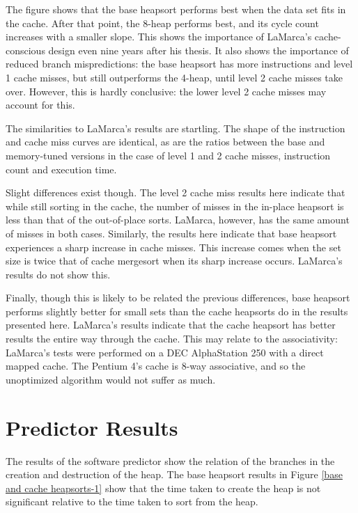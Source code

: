 The figure shows that the base heapsort performs best when the data set fits in
the cache. After that point, the 8-heap performs best, and its cycle count increases
with a smaller slope. This shows the importance of LaMarca's cache-conscious
design even nine years after his thesis. It also shows the importance of reduced
branch mispredictions: the base heapsort has more instructions and level 1 cache
misses, but still outperforms the 4-heap, until level 2 cache misses take over.
However, this is hardly conclusive: the lower level 2 cache misses may account
for this.

The similarities to LaMarca's results are startling. The shape of the
instruction and cache miss curves are identical, as are the ratios between the
base and memory-tuned versions in the case of level 1 and 2 cache misses,
instruction count and execution time.

Slight differences exist though. The level 2 cache miss results here indicate
that while still sorting in the cache, the number of misses in the in-place
heapsort is less than that of the out-of-place sorts. LaMarca, however, has the
same amount of misses in both cases. Similarly, the results here indicate that
base heapsort experiences a sharp increase in cache misses. This increase comes
when the set size is twice that of cache mergesort when its sharp increase
occurs. LaMarca's results do not show this.

Finally, though this is likely to be related the previous differences, base
heapsort performs slightly better for small sets than the cache heapsorts do in
the results presented here. LaMarca's results indicate that the cache heapsort
has better results the entire way through the cache. This may relate to the
associativity: LaMarca's tests were performed on a DEC AlphaStation 250 with a
direct mapped cache. The Pentium 4's cache is 8-way associative, and so the
unoptimized algorithm would not suffer as much.

\section{Predictor Results}


The results of the software predictor show the relation of the branches
in the creation and destruction of the heap. The base heapsort results in
Figure \ref{base and cache heapsorts-1} show that the time taken to create the
heap is not significant relative to the time taken to sort from the heap.

